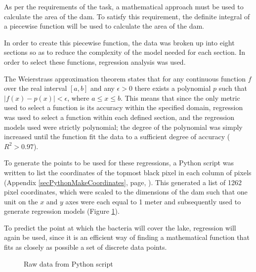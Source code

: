 \documentclass[a4paper]{article}
\theoremstyle{definition}
\begin{document}
    As per the requirements of the task, a mathematical approach must be used to calculate the area of the dam. To satisfy this requirement, the definite integral of a piecewise function will be used to calculate the area of the dam.

    In order to create this piecewise function, the data was broken up into eight sections so as to reduce the complexity of the model needed for each section. In order to select these functions, regression analysis was used.

    The Weierstrass approximation theorem states that for any continuous function $f$ over the real interval $[a, b]$ and any $\epsilon > 0$ there exists a polynomial $p$ such that $|f(x) - p(x)| < \epsilon$, where $a \leq x \leq b$. This means that since the only metric used to select a function is its accuracy within the specified domain, regression was used to select a function within each defined section, and the regression models used were strictly polynomial; the degree of the polynomial was simply increased until the function fit the data to a sufficient degree of accuracy ($R^2 > 0.97$).

    To generate the points to be used for these regressions, a Python script was written to list the coordinates of the topmost black pixel in each column of pixels (Appendix \ref{secPythonMakeCoordinates}, page, \pageref{secPythonMakeCoordinates}). This generated a list of 1262 pixel coordinates, which were scaled to the dimensions of the dam such that one unit on the $x$ and $y$ axes were each equal to 1 meter and subsequently used to generate regression models (Figure \ref{figRawData}).

    To predict the point at which the bacteria will cover the lake, regression will again be used, since it is an efficient way of finding a mathematical function that fits as closely as possible a set of discrete data points.


    \begin{figure} %
        \centering
        \caption{Raw data from Python script}
        \label{figRawData}
    \end{figure}
\end{document}
